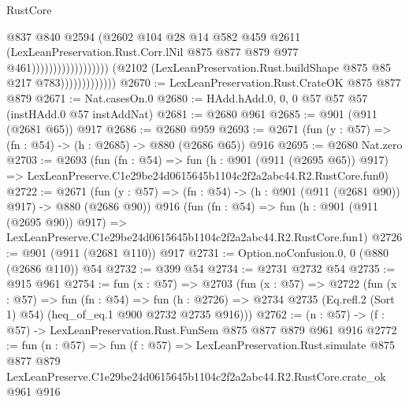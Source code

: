 \begin{lexlean}{RustCore}
\begin{coremodule}
                                                          @837
                                                          @840
                                                          @2594
                                                          (@2602
                                                            @104
                                                            @28
                                                            @14
                                                            @582
                                                            @459
                                                            @2611
                                                            (LexLeanPreservation.Rust.Corr.lNil
                                                              @875
                                                              @877
                                                              @879
                                                              @977
                                                              @461))))))))))))))))))
                          (@2102
                            (LexLeanPreservation.Rust.buildShape @875 @85 @217 @783)))))))))))))
@2670 := LexLeanPreservation.Rust.CrateOK @875 @877 @879
@2671 := Nat.casesOn.{0}
@2680 := HAdd.hAdd.{0, 0, 0} @57 @57 @57 (instHAdd.{0} @57 instAddNat)
@2681 := @2680 @961
@2685 := @901 (@911 (@2681 @65)) @917
@2686 := @2680 @959
@2693 := @2671 (fun (y : @57) => (fn : @54) -> (h : @2685) -> @880 (@2686 @65)) @916
@2695 := @2680 Nat.zero
@2703 := @2693
    (fun (fn : @54) =>
    fun (h : @901 (@911 (@2695 @65)) @917) =>
    LexLeanPreserve.C1e29be24d0615645b1104c2f2a2abc44.R2.RustCore.fun0)
@2722 := @2671
    (fun (y : @57) => (fn : @54) -> (h : @901 (@911 (@2681 @90)) @917) -> @880 (@2686 @90))
    @916
    (fun (fn : @54) =>
    fun (h : @901 (@911 (@2695 @90)) @917) =>
    LexLeanPreserve.C1e29be24d0615645b1104c2f2a2abc44.R2.RustCore.fun1)
@2726 := @901 (@911 (@2681 @110)) @917
@2731 := Option.noConfusion.{0, 0} (@880 (@2686 @110)) @54
@2732 := @399 @54
@2734 := @2731 @2732 @54
@2735 := @915 @961
@2754 := fun (x : @57) =>
  @2703
    (fun (x : @57) =>
    @2722
      (fun (x : @57) =>
      fun (fn : @54) =>
      fun (h : @2726) =>
      @2734 @2735 (Eq.refl.{2} (Sort 1) @54) (heq_of_eq.{1} @900 @2732 @2735 @916)))
@2762 := (n : @57) -> (f : @57) -> LexLeanPreservation.Rust.FunSem @875 @877 @879 @961 @916
@2772 := fun (n : @57) =>
  fun (f : @57) =>
  LexLeanPreservation.Rust.simulate
    @875
    @877
    @879
    LexLeanPreserve.C1e29be24d0615645b1104c2f2a2abc44.R2.RustCore.crate_ok
    @961
    @916
\end{coremodule}
\end{lexlean}
